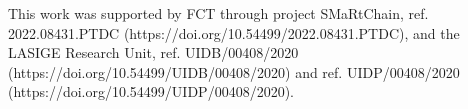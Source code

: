 \documentclass[runningheads]{llncs}
\begin{document}

\begin{credits}
\subsubsection{\ackname} This work was supported by FCT through project SMaRtChain, ref. 2022.08431.PTDC (https://doi.org/10.54499/2022.08431.PTDC), and the LASIGE Research Unit, ref. UIDB/00408/2020 (https://doi.org/10.54499/UIDB/00408/2020) and ref. UIDP/00408/2020 (https://doi.org/10.54499/UIDP/00408/2020).


\end{credits}
%
%
%
 
 
%
\end{document}
